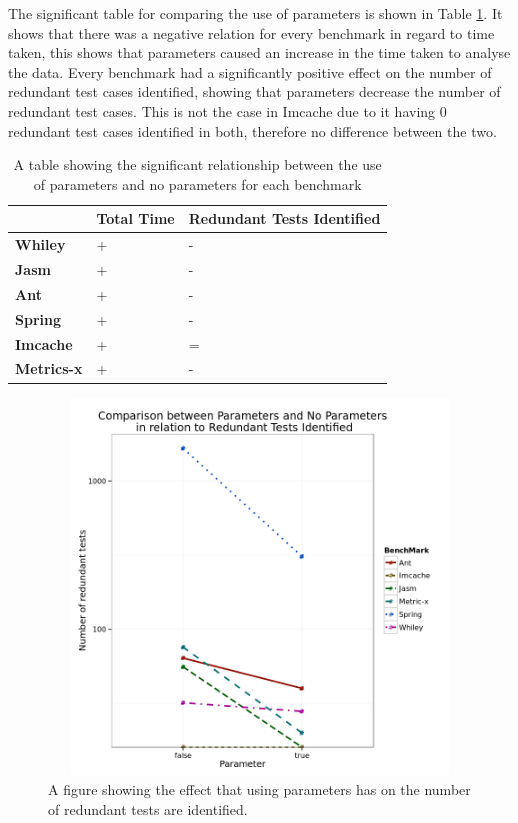 The significant table for comparing the use of parameters is shown in Table \ref{parametersig}. It shows that there was a negative relation for every benchmark in regard to time taken, this shows that parameters caused an increase in the time taken to analyse the data. Every benchmark had a significantly positive effect on the number of redundant test cases identified, showing that parameters decrease the number of redundant test cases. This is not the case in Imcache due to it having 0 redundant test cases identified in both, therefore no difference between the two.


\begin{table}[h]
\centering


\begin{tabular}{|l|l|l|}
\hline
{\bf }          & {\bf Total Time} & {\bf Redundant Tests Identified} \\ \hline
{\bf Whiley}    & +                & -                           \\ \hline
{\bf Jasm}      & +               & -                          \\ \hline
{\bf Ant}       & +                & -                           \\ \hline
{\bf Spring}    & +                & -                           \\ \hline
{\bf Imcache}   & +                & =                           \\ \hline
{\bf Metrics-x} & +                & -                           \\ \hline
\end{tabular}
\caption{A table showing the significant relationship between the use of parameters and no parameters for each benchmark}
\label{parametersig}
\end{table}

\begin{figure}[H]
\begin{center}
\includegraphics[height=10cm, width = 14.5cm]{Parameters.png}
\end{center}
\caption{A figure showing the effect that using parameters has on the number of redundant tests are identified.}
\label{fig:paramgraph}
\end{figure}


